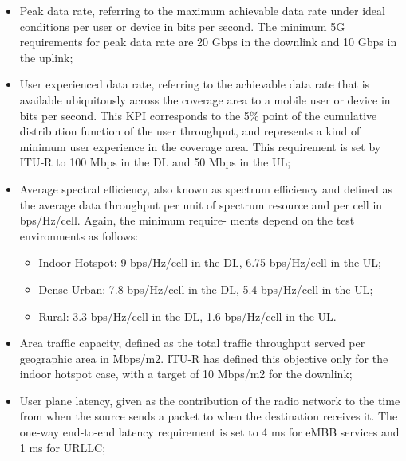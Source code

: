 \documentclass[a4paper,12pt]{report} %
\begin{document}
\begin{itemize}
\item Peak data rate, referring to the maximum achievable data rate under ideal conditions per user or
device in bits per second. The minimum 5G requirements for peak data rate are 20 Gbps in the
downlink and 10 Gbps in the uplink;
\end{itemize}
\begin{itemize}
\item User experienced data rate, referring to the achievable data rate that is available ubiquitously
across the coverage area to a mobile user or device in bits per second. This KPI corresponds to the
5\% point of the cumulative distribution function of the user throughput, and represents
a kind of minimum user experience in the coverage area. This requirement is set by ITU‐R to
100 Mbps in the DL and 50 Mbps in the UL;
\end{itemize}
\begin{itemize}
\item Average spectral efficiency, also known as spectrum efficiency and defined as the average data
throughput per unit of spectrum resource and per cell in bps/Hz/cell. Again, the minimum require-
ments depend on the test environments as follows:
\begin{itemize}
\item Indoor Hotspot: 9 bps/Hz/cell in the DL, 6.75 bps/Hz/cell in the UL;
\end{itemize}
\begin{itemize}
\item Dense Urban: 7.8 bps/Hz/cell in the DL, 5.4 bps/Hz/cell in the UL;
\end{itemize}
\begin{itemize}
\item Rural: 3.3 bps/Hz/cell in the DL, 1.6 bps/Hz/cell in the UL.
\end{itemize}
\end{itemize}
\begin{itemize}
\item Area traffic capacity, defined as the total traffic throughput served per geographic area in Mbps/m2.
ITU‐R has defined this objective only for the indoor hotspot case, with a target of 10 Mbps/m2 for
the downlink;
\end{itemize}
\begin{itemize}
\item User plane latency, given as the contribution of the radio network to the time from when the
source sends a packet to when the destination receives it. The one‐way end‐to‐end latency
requirement is set to 4 ms for eMBB services and 1 ms for URLLC;
\end{itemize}
\end{document}
